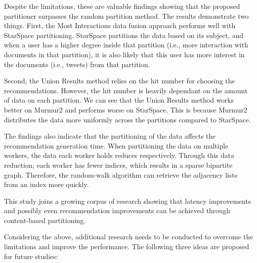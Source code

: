 Despite the limitations, these are valuable findings showing that the proposed partitioner surpasses the random partition method. The results demonstrate two things. First, the Most Interactions data fusion approach performs well with StarSpace partitioning. StarSpace partitions the data based on its subject, and when a user has a higher degree inside that partition (i.e., more interaction with documents in that partition), it is also likely that this user has more interest in the documents (i.e., tweets) from that partition. 


Second, the Union Results method relies on the hit number for choosing the recommendations. However, the hit number is heavily dependant on the amount of data on each partition. We can see that the Union Results method works better on Murmur2 and performs worse on StarSpace. This is because Murmur2 distributes the data more uniformly across the partitions compared to StarSpace.


The findings also indicate that the partitioning of the data affects the recommendation generation time. When partitioning the data on multiple workers, the data each worker holds reduces respectively. Through this data reduction, each worker has fewer indices, which results in a sparse bipartite graph. Therefore, the random-walk algorithm can retrieve the adjacency lists from an index more quickly.


This study joins a growing corpus of research showing that latency improvements and possibly even recommendation improvements can be achieved through content-based partitioning.


Considering the above, additional research needs to be conducted to overcome the limitations and improve the performance. The following three ideas are proposed for future studies:

